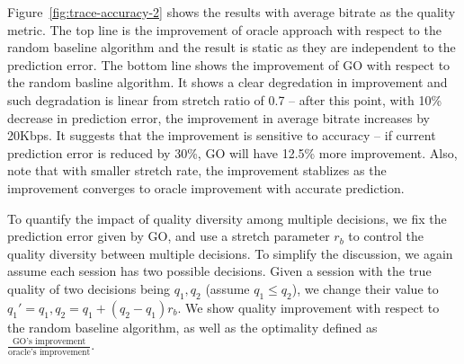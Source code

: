 Figure~\ref{fig:trace-accuracy-2} shows the results with average bitrate as the quality metric. The top line is the improvement of oracle approach with respect to the random baseline algorithm and the result is static as they are independent to the prediction error. The bottom line shows the improvement of GO with respect to the random basline algorithm. 
It shows a clear degredation in improvement and such degradation is linear from stretch ratio of 0.7 -- after this point, with 10\% decrease in prediction error, the improvement in average bitrate increases by 20Kbps. It suggests that the improvement is sensitive to accuracy -- if current prediction error is reduced by 30\%, GO will have 12.5\% more improvement. Also, note that with smaller stretch rate, the improvement stablizes as the improvement converges to oracle improvement with accurate prediction.



\label{subsec:impact-diversity}

To quantify the impact of quality diversity among multiple decisions, we fix the prediction error given by GO, and use a stretch parameter $r_b$ to control the quality diversity between multiple decisions. To simplify the discussion, we again assume each session has two possible decisions. Given a session with the true quality of two decisions being $q_1, q_2$ (assume $q_1\leq q_2$), we change their value to $q_1'=q_1, q_2=q_1+(q_2-q_1)r_b$. We show quality improvement with respect to the random baseline algorithm, as well as the optimality defined as $\frac{\textrm{GO's improvement}}{\textrm{oracle's improvement}}$.


